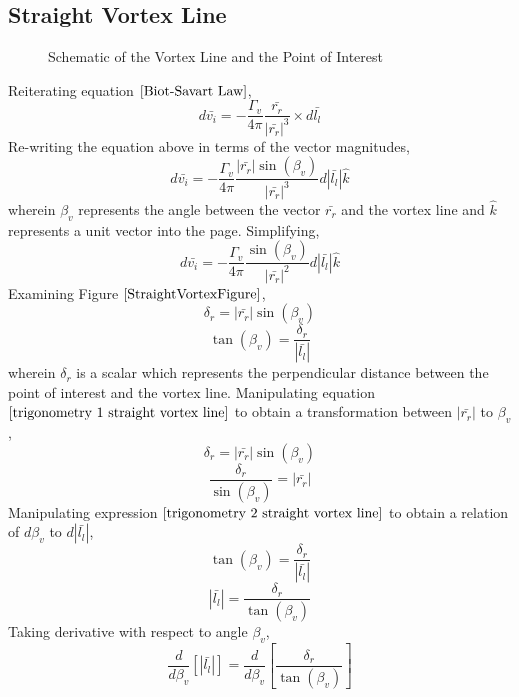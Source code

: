 \documentclass[a4paper, 12pt]{report}
\begin{document}
\begin{center}
\subsection{Straight Vortex Line}
\begin{comment}
\end{comment}
\begin{figure}[H]\centering
\caption{Schematic of the Vortex Line and the Point of Interest}
\label{StraightVortexFigure}
\end{figure}
Reiterating equation $\ref{Biot-Savart Law}$,
$$d\bar{v_{i}} = -\frac{\Gamma_{v}}{4\pi}\frac{\bar{r_{r}}}{|\bar{r_{r}}|^{3}}\times d\bar{l_{l}}$$
Re-writing the equation above in terms of the vector magnitudes,
$$d\bar{v_{i}} = -\frac{\Gamma_{v}}{4\pi}\frac{|\bar{r_{r}}|\sin(\beta_{v})}{|\bar{r_{r}}|^{3}}d|\bar{l_{l}}|\hat{k}$$
wherein $\beta_{v}$ represents the angle between the vector $\bar{r_{r}}$ and the vortex line and $\hat{k}$ represents a unit vector into the page. Simplifying,
\begin{equation}
d\bar{v_{i}} = -\frac{\Gamma_{v}}{4\pi}\frac{\sin(\beta_{v})}{|\bar{r_{r}}|^{2}}d|\bar{l_{l}}|\hat{k}
\label{Straight Biot-Savart Magnitudes}
\end{equation}
Examining Figure $\ref{StraightVortexFigure}$,
\begin{equation}
\delta_{r} = |\bar{r_{r}}|\sin(\beta_{v})
\label{trigonometry 1 straight vortex line}
\end{equation}
\begin{equation}
\tan(\beta_{v}) = \frac{\delta_{r}}{|\bar{l_{l}}|}
\label{trigonometry 2 straight vortex line}
\end{equation}
wherein $\delta_{r}$ is a scalar which represents the perpendicular distance between the point of interest and the vortex line. Manipulating equation $\ref{trigonometry 1 straight vortex line}$ to obtain a transformation between $|\bar{r_{r}}|$ to $\beta_{v}$,
$$\delta_{r} = |\bar{r_{r}}|\sin(\beta_{v})$$
\begin{equation}
\frac{\delta_{r}}{\sin(\beta_{v})} = |\bar{r_{r}}|
\label{transformation of veclength 2 perp distance}
\end{equation}
Manipulating expression $\ref{trigonometry 2 straight vortex line}$ to obtain a relation of $d\beta_{v}$ to $d|\bar{l_{l}}|$,
$$\tan(\beta_{v}) = \frac{\delta_{r}}{|\bar{l_{l}}|}$$
$$|\bar{l_{l}}| = \frac{\delta_{r}}{\tan(\beta_{v})}$$
Taking derivative with respect to angle $\beta_{v}$,
$$\frac{d}{d \beta_{v}}\left[|\bar{l_{l}}|\right] = \frac{d}{d \beta_{v}}\left[\frac{\delta_{r}}{\tan(\beta_{v})}\right]$$

\end{center}
\end{document}
